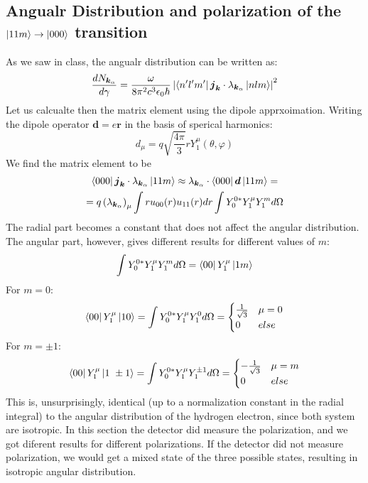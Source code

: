 \documentclass{article}
\begin{document}
\subsection{Angualr Distribution and polarization of the $\ket{11m}\rightarrow\ket{000}$ transition}
As we saw in class, the angualr distribution can be written as:
\begin{equation}
    \frac{dN_{\boldsymbol{k}_\alpha}}{d\gamma} = \frac{\omega}{8\pi^2c^3\epsilon_0\hbar}\left|\bra{n'l'm'}\boldsymbol{j}_{\boldsymbol{k}}\cdot{\lambda}_{\boldsymbol{k}_{\alpha}}\ket{nlm}\right|^2
\end{equation}
Let us calcualte then the matrix element using the dipole apprxoimation. Writing the dipole operator $
\boldsymbol{d} = e\boldsymbol{r}$ in the basis of sperical harmonics:
\begin{equation}
    d_\mu = q\sqrt{\frac{4\pi}{3}} r Y^{\mu}_1(\theta, \varphi)
\end{equation}
We find the matrix element to be
\begin{equation}
\begin{gathered}
    \bra{000}\boldsymbol{j}_{\boldsymbol{k}}\cdot{\lambda}_{\boldsymbol{k}_{\alpha}}\ket{11m} \approx
    {\lambda}_{\boldsymbol{k}_{\alpha}}\cdot\bra{000}\boldsymbol{d}\ket{11m} =
    \\ =
    q \left({\lambda}_{\boldsymbol{k}_{\alpha}}\right)_\mu \int r u_{00}(r) u_{11}(r)dr\int Y^{0*}_{0} Y^{\mu}_1
     Y^{m}_{1}
    d\Omega
\end{gathered}
\end{equation}
The radial part becomes a constant that does not affect the angular distribution. The angular part, however, gives different results for different values of $m$:
\begin{equation}
    \int Y^{0*}_{0} Y^{\mu}_1 Y^{m}_{1} d\Omega = \bra{00}Y^{\mu}_1 \ket{1m}
\end{equation}
For $m = 0$:
\begin{equation}
    \bra{00}Y^{\mu}_1 \ket{10} = \int Y^{0*}_{0} Y^{\mu}_1 Y^{0}_{1} d\Omega = \begin{cases}
        \frac{1}{\sqrt{3}} & \mu = 0 \\ 0 & else
    \end{cases}
\end{equation}
For $m = \pm 1$:
\begin{equation}
    \bra{00}Y^{\mu}_1 \ket{1 \ \pm1} = \int Y^{0*}_{0} Y^{\mu}_1 Y^{\pm 1}_{1} d\Omega = \begin{cases}
        -\frac{1}{\sqrt{3}} & \mu = m \\ 0 & else
    \end{cases}
\end{equation}
This is, unsurprisingly, identical (up to a normalization constant in the radial integral) to the angular distribution of the hydrogen electron, since both system are isotropic.
\newline
In this section the detector did measure the polarization, and we got diferent results for different polarizations. If the detector did not measure polarization, we would get a mixed state of the three possible states, resulting in isotropic angular distribution.
\end{document}
